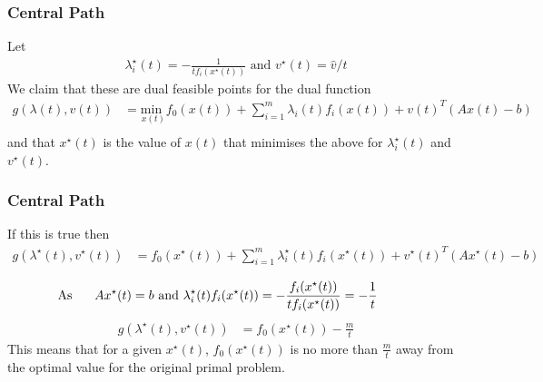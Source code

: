 \documentclass{beamer}
\begin{document}
\begin{frame}
    \frametitle{Central Path}
    Let
    \begin{align*}
        \lambda_{i}^{\star}(t) = -\frac{1}{t f_{i}(x^{\star}(t))} \text{ and }
        v^{\star}(t) = \hat{v} / {t}
    \end{align*}
    We claim that these are dual feasible points for the dual function
    \begin{align*}
        g(\lambda(t), v(t)) &= \underset{x(t)}{\text{min }}f_{0}(x(t))
        + \sum\limits_{i=1}^{m}\lambda_{i}(t)f_{i}(x(t))
        + v(t)^{T}(Ax(t) - b) \\
    \end{align*}
    and that $x^{\star}(t)$ is the value of $x(t)$ that minimises the above for
    $\lambda_{i}^{\star}(t)$ and $v^{\star}(t)$.
\end{frame}

\begin{frame}
    \frametitle{Central Path}
    If this is true then
    {\footnotesize
        \begin{align*}
            g(\lambda^{\star}(t), v^{\star}(t)) &= f_{0}(x^{\star}(t))
            + \sum\limits_{i=1}^{m}\lambda_{i}^{\star}(t)f_{i}(x^{\star}(t))
            + v^{\star}(t)^{T}(Ax^{\star}(t) - b) \\
        \end{align*}
    }
    \vspace{-10mm}
    \begin{align*}
        \hspace{-10mm}\text{As }\hspace{5mm}  Ax^{\star}(t) = b \text{ and } \lambda_{i}^{\star}(t)f_{i}(x^{\star}(t))
        = -\frac{f_{i}(x^{\star}(t))}{t f_{i}(x^{\star}(t))}
        = -\frac{1}{t}
    \end{align*}
    \begin{align*}
        g(\lambda^{\star}(t), v^{\star}(t)) &= f_{0}(x^{\star}(t)) -
        \frac{m}{t}
    \end{align*}
    This means that for a given $x^{\star}(t)$, $f_{0}(x^{\star}(t))$ is no more than
    $\frac{m}{t}$ away from the optimal value for the original primal problem.
\end{frame}
\end{document}
